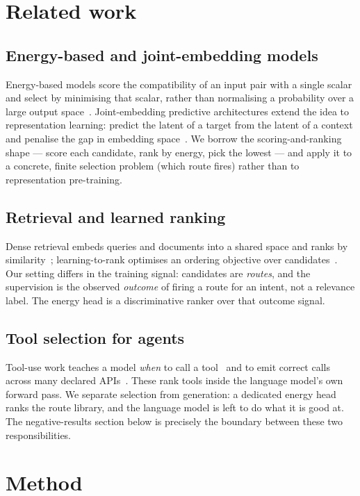 \documentclass[11pt]{article}
\begin{document}
\section{Related work}
\subsection{Energy-based and joint-embedding models}
Energy-based models score the compatibility of an input pair with a single scalar
and select by minimising that scalar, rather than normalising a probability over a
large output space~\cite{lecun}. Joint-embedding predictive architectures extend
the idea to representation learning: predict the latent of a target from the latent
of a context and penalise the gap in embedding space~\cite{ijepa}. We borrow the
scoring-and-ranking shape --- score each candidate, rank by energy, pick the lowest
--- and apply it to a concrete, finite selection problem (which route fires) rather
than to representation pre-training.

\subsection{Retrieval and learned ranking}
Dense retrieval embeds queries and documents into a shared space and ranks by
similarity~\cite{dpr}; learning-to-rank optimises an ordering objective over
candidates~\cite{ltr}. Our setting differs in the training signal: candidates are
\emph{routes}, and the supervision is the observed \emph{outcome} of firing a route
for an intent, not a relevance label. The energy head is a discriminative ranker
over that outcome signal.

\subsection{Tool selection for agents}
Tool-use work teaches a model \emph{when} to call a tool~\cite{toolformer} and to
emit correct calls across many declared APIs~\cite{gorilla}. These rank tools
inside the language model's own forward pass. We separate selection from
generation: a dedicated energy head ranks the route library, and the language model
is left to do what it is good at. The negative-results section below is precisely
the boundary between these two responsibilities.

\section{Method}
\end{document}
